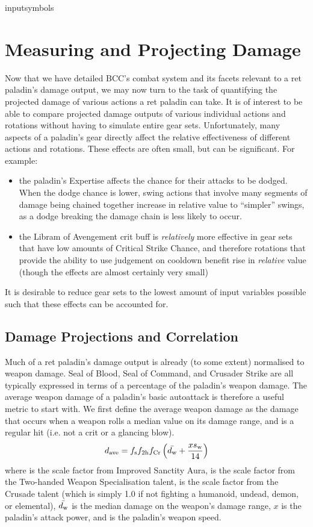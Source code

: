 input{symbols}

\section{Measuring and Projecting Damage}
Now that we have detailed BCC's combat system and its facets relevant to a ret paladin's damage output, we may now turn to the task of quantifying the projected damage of various actions a ret paladin can take.
It is of interest to be able to compare projected damage outputs of various individual actions and rotations without having to simulate entire gear sets.
Unfortunately, many aspects of a paladin's gear directly affect the relative effectiveness of different actions and rotations.
These effects are often small, but can be significant.
For example:
\begin{itemize}
	\item the paladin's Expertise affects the chance for their attacks to be dodged. When the dodge chance is lower, swing actions that involve many segments of damage being chained together increase in relative value to ``simpler'' swings, as a dodge breaking the damage chain is less likely to occur.
	\item the Libram of Avengement crit buff is \emph{relatively} more effective in gear sets that have low amounts of Critical Strike Chance, and therefore rotations that provide the ability to use judgement on cooldown benefit rise in \emph{relative} value (though the effects are almost certainly very small)
\end{itemize}
It is desirable to reduce gear sets to the lowest amount of input variables possible such that these effects can be accounted for.

\subsection{Damage Projections and Correlation}
Much of a ret paladin's damage output is already (to some extent) normalised to weapon damage.	
Seal of Blood, Seal of Command, and Crusader Strike are all typically expressed in terms of a percentage of the paladin's weapon damage.
The average weapon damage of a paladin's basic autoattack is therefore a useful metric to start with.
We first define the average weapon damage as the damage that occurs when a weapon rolls a median value on its damage range, and is a regular hit (i.e. not a crit or a glancing blow).
\begin{equation}
	d_{\mathrm{ave}}  = f_{\mathrm{s}}  f_{\mathrm{2h}}  f_{\mathrm{Cr}}  \left( \bar{d_\mathrm{w} } + \frac{xs_\mathrm{w} }{14} \right)
\end{equation}
where \fimpsanc is the scale factor from Improved Sanctity Aura, \ftwoh is the scale factor from the Two-handed Weapon Specialisation talent, \fcrusade is the scale factor from the Crusade talent (which is simply 1.0 if not fighting a humanoid, undead, demon, or elemental), $\bar{d_\mathrm{w} }$ is the median damage on the weapon's damage range, $x$ is the paladin's attack power, and \ws is the paladin's weapon speed.

